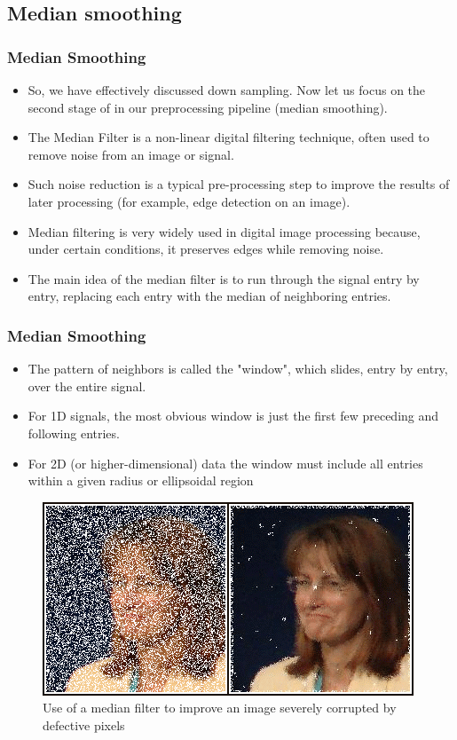 \documentclass{beamer}
\begin{document}
\subsection{Median smoothing}
\begin{frame}
\frametitle{Median Smoothing}
\begin{itemize}
   \item So, we have effectively discussed down sampling. Now let us focus on the second stage of in our preprocessing pipeline (median smoothing).
   \item The Median Filter is a non-linear digital filtering technique, often used to remove noise from an image or signal.
   \item Such noise reduction is a typical pre-processing step to improve the results of later processing (for example, edge detection on an image). 
   \item Median filtering is very widely used in digital image processing because, under certain conditions, it preserves edges while removing noise.
   \item The main idea of the median filter is to run through the signal entry by entry, replacing each entry with the median of neighboring entries.
\end{itemize}
\end{frame}


\begin{frame}
\frametitle{Median Smoothing}
\begin{itemize}
   \item The pattern of neighbors is called the "window", which slides, entry by entry, over the entire signal.
   \item  For 1D signals, the most obvious window is just the first few preceding and following entries. 
   \item For 2D (or higher-dimensional) data the window must include all entries within a given radius or ellipsoidal region
\end{itemize}
\begin{figure}
    \centering
    \includegraphics[scale=0.45]{medianfilter.png}
    \caption{Use of a median filter to improve an image severely corrupted by defective pixels}
    \label{fig:median_filter}
\end{figure}
\end{frame}
\end{document}
